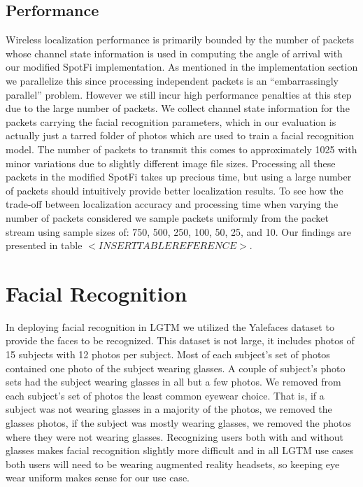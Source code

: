 \documentclass[12pt]{report}
\begin{document}
\subsection{Performance}
Wireless localization performance is primarily bounded by the number of packets whose channel state information is used in computing the angle of arrival with our modified SpotFi implementation. As mentioned in the implementation section we parallelize this since processing independent packets is an ``embarrassingly parallel'' problem. However we still incur high performance penalties at this step due to the large number of packets. We collect channel state information for the packets carrying the facial recognition parameters, which in our evaluation is actually just a tarred folder of photos which are used to train a facial recognition model. The number of packets to transmit this comes to approximately 1025 with minor variations due to slightly different image file sizes. Processing all these packets in the modified SpotFi takes up precious time, but using a large number of packets should intuitively provide better localization results. To see how the trade-off between localization accuracy and processing time when varying the number of packets considered we sample packets uniformly from the packet stream using sample sizes of: 750, 500, 250, 100, 50, 25, and 10. Our findings are presented in table $<INSERT TABLE REFERENCE>$. \par

\section{Facial Recognition}
In deploying facial recognition in LGTM we utilized the Yalefaces \cite{FisherfacesBelhumeur1997} dataset to provide the faces to be recognized. This dataset is not large, it includes photos of 15 subjects with 12 photos per subject. Most of each subject's set of photos contained one photo of the subject wearing glasses. A couple of subject's photo sets had the subject wearing glasses in all but a few photos. We removed from each subject's set of photos the least common eyewear choice. That is, if a subject was not wearing glasses in a majority of the photos, we removed the glasses photos, if the subject was mostly wearing glasses, we removed the photos where they were not wearing glasses. Recognizing users both with and without glasses makes facial recognition slightly more difficult and in all LGTM use cases both users will need to be wearing augmented reality headsets, so keeping eye wear uniform makes sense for our use case. \par
\end{document}
